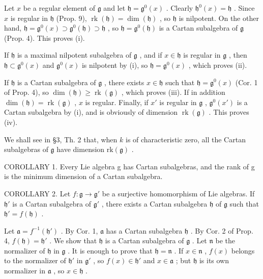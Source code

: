 Let \(x\) be a regular element of \(\mathfrak{g}\) and let \(\mathfrak{h} = \mathfrak{g}^0(x)\) . Clearly \(\mathfrak{h}^0(x) = \mathfrak{h}\) . Since \(x\) is regular in \(\mathfrak{h}\) (Prop. 9), \(\operatorname{rk}(\mathfrak{h}) = \dim(\mathfrak{h})\) , so \(\mathfrak{h}\) is nilpotent. On the other hand, \(\mathfrak{h} = \mathfrak{g}^0(x) \supset \mathfrak{g}^0(\mathfrak{h}) \supset \mathfrak{h}\) , so \(\mathfrak{h} = \mathfrak{g}^0(\mathfrak{h})\) is a Cartan subalgebra of \(\mathfrak{g}\) (Prop. 4). This proves (i).

If \(\mathfrak{h}\) is a maximal nilpotent subalgebra of \(\mathfrak{g}\) , and if \(x\in \mathfrak{h}\) is regular in \(\mathfrak{g}\) , then \(\mathfrak{h}\subset \mathfrak{g}^0 (x)\) and \(\mathfrak{g}^0 (x)\) is nilpotent by (i), so \(\mathfrak{h} = \mathfrak{g}^0 (x)\) , which proves (ii).

If \(\mathfrak{h}\) is a Cartan subalgebra of \(\mathfrak{g}\) , there exists \(x \in \mathfrak{h}\) such that \(\mathfrak{h} = \mathfrak{g}^0(x)\) (Cor. 1 of Prop. 4), so \(\dim(\mathfrak{h}) \geq \operatorname{rk}(\mathfrak{g})\) , which proves (iii). If in addition \(\dim(\mathfrak{h}) = \operatorname{rk}(\mathfrak{g})\) , \(x\) is regular. Finally, if \(x'\) is regular in \(\mathfrak{g}\) , \(\mathfrak{g}^0(x')\) is a Cartan subalgebra by (i), and is obviously of dimension \(\operatorname{rk}(\mathfrak{g})\) . This proves (iv).

We shall see in §3, Th. 2 that, when \(k\) is of characteristic zero, all the Cartan subalgebras of \(\mathfrak{g}\) have dimension \(\mathrm{rk}(\mathfrak{g})\) .

COROLLARY 1. Every Lie algebra g has Cartan subalgebras, and the rank of g is the minimum dimension of a Cartan subalgebra.

COROLLARY 2. Let \(f: \mathfrak{g} \to \mathfrak{g}'\) be a surjective homomorphism of Lie algebras. If \(\mathfrak{h}'\) is a Cartan subalgebra of \(\mathfrak{g}'\) , there exists a Cartan subalgebra \(\mathfrak{h}\) of \(\mathfrak{g}\) such that \(\mathfrak{h}' = f(\mathfrak{h})\) .

Let \(\mathfrak{a} = f^{-1}(\mathfrak{h}')\) . By Cor. 1, \(\mathfrak{a}\) has a Cartan subalgebra \(\mathfrak{h}\) . By Cor. 2 of Prop. 4, \(f(\mathfrak{h}) = \mathfrak{h}'\) . We show that \(\mathfrak{h}\) is a Cartan subalgebra of \(\mathfrak{g}\) . Let \(\mathfrak{n}\) be the normalizer of \(\mathfrak{h}\) in \(\mathfrak{g}\) . It is enough to prove that \(\mathfrak{h} = \mathfrak{n}\) . If \(x \in \mathfrak{n}\) , \(f(x)\) belongs to the normalizer of \(\mathfrak{h}'\) in \(\mathfrak{g}'\) , so \(f(x) \in \mathfrak{h}'\) and \(x \in \mathfrak{a}\) ; but \(\mathfrak{h}\) is its own normalizer in \(\mathfrak{a}\) , so \(x \in \mathfrak{h}\) .

